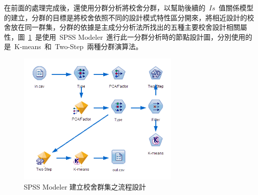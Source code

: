 
在前面的處理完成後，還使用分群分析將校舍分群，以幫助後續的~$Is$~值關係模型的建立，分群的目標是將校舍依照不同的設計模式特性區分開來，將相近設計的校舍放在同一群集，分群的依據是主成分分析法所找出的五種主要校舍設計相關屬性，圖~\ref{fig:spss-cluster}~是使用~SPSS Modeler~進行此一分群分析時的節點設計圖，分別使用的是~K-means~和~Two-Step~兩種分群演算法。

\begin{figure}[hbtp]
  \begin{center}
    \includegraphics[width=0.7\textwidth]{figures/spss-cluster.png}
    \caption{SPSS Modeler 建立校舍群集之流程設計} 
    \label{fig:spss-cluster}
  \end{center}
\end{figure}


